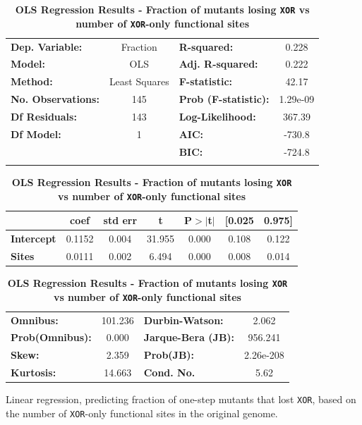 \documentclass[10pt,letterpaper,final]{article}
\begin{document}
	\begin{table}[h]
	\centering
	\caption{\textbf{OLS Regression Results - Fraction of mutants losing \texttt{XOR} vs number of \texttt{XOR}-only functional sites}}
	\label{ce-olsregression-1step-XOR-h}
	\begin{tabular}{lclc}
	\toprule
	\textbf{Dep. Variable:}    &     Fraction     & \textbf{  R-squared:         } &     0.228   \\
	\textbf{Model:}            &       OLS        & \textbf{  Adj. R-squared:    } &     0.222   \\
	\textbf{Method:}           &  Least Squares   & \textbf{  F-statistic:       } &     42.17   \\
	\textbf{No. Observations:} &         145      & \textbf{  Prob (F-statistic):} &  1.29e-09   \\
	\textbf{Df Residuals:}     &         143      & \textbf{  Log-Likelihood:    } &    367.39   \\
	\textbf{Df Model:}         &           1      & \textbf{  AIC:               } &    -730.8   \\
	&      & \textbf{  BIC:               } &    -724.8   \\
	&      & \textbf{                     } &             \\
	\bottomrule
	\end{tabular}
	\begin{tabular}{lcccccc}
	                   & \textbf{coef} & \textbf{std err} & \textbf{t} & \textbf{P$>$$|$t$|$} & \textbf{[0.025} & \textbf{0.975]}  \\
	\midrule
	\textbf{Intercept} &       0.1152  &        0.004     &    31.955  &         0.000        &        0.108    &        0.122     \\
	\textbf{Sites}     &       0.0111  &        0.002     &     6.494  &         0.000        &        0.008    &        0.014     \\
	\bottomrule
	\end{tabular}
	\begin{tabular}{lclc}
	\textbf{Omnibus:}       & 101.236 & \textbf{  Durbin-Watson:     } &     2.062  \\
	\textbf{Prob(Omnibus):} &   0.000 & \textbf{  Jarque-Bera (JB):  } &   956.241  \\
	\textbf{Skew:}          &   2.359 & \textbf{  Prob(JB):          } & 2.26e-208  \\
	\textbf{Kurtosis:}      &  14.663 & \textbf{  Cond. No.          } &      5.62  \\
	\bottomrule
	\end{tabular}
	\begin{flushleft}Linear regression, predicting fraction of one-step mutants that lost \texttt{XOR}, based on the number of \texttt{XOR}-only functional sites in the original genome.  
	\end{flushleft}
	\label{ce-olsregression-1step-XOR}
	\end{table}
\end{document}
